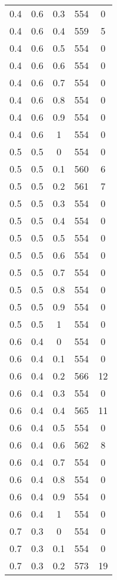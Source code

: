 \begin{table}
\begin{minipage}[!h]{0.50\hsize}
\begin{center}
{\begin{tabular}{|c|c|c|c|c|}
					0.4  & 0.6  & 0.3  & 554  & 0     \\
					0.4  & 0.6  & 0.4  & 559  & 5     \\
					0.4  & 0.6  & 0.5  & 554  & 0     \\
					0.4  & 0.6  & 0.6  & 554  & 0     \\
					0.4  & 0.6  & 0.7  & 554  & 0     \\
					0.4  & 0.6  & 0.8  & 554  & 0   \\
					0.4  & 0.6  & 0.9  & 554  & 0     \\
					0.4  & 0.6  & 1    & 554  & 0     \\ \hline
					0.5  & 0.5  & 0    & 554  & 0   \\
					0.5  & 0.5  & 0.1  & 560  & 6     \\
					0.5  & 0.5  & 0.2  & 561  & 7     \\
					0.5  & 0.5  & 0.3  & 554  & 0   \\
					0.5  & 0.5  & 0.4  & 554  & 0     \\
					0.5  & 0.5  & 0.5  & 554  & 0     \\
					0.5  & 0.5  & 0.6  & 554  & 0     \\
					0.5  & 0.5  & 0.7  & 554  & 0     \\
					0.5  & 0.5  & 0.8  & 554  & 0     \\
					0.5  & 0.5  & 0.9  & 554  & 0     \\
					0.5  & 0.5  & 1    & 554  & 0     \\ \hline
					0.6  & 0.4  & 0    & 554  & 0   \\
					0.6  & 0.4  & 0.1  & 554  & 0     \\
					0.6  & 0.4  & 0.2  & 566  & 12     \\
					0.6  & 0.4  & 0.3  & 554  & 0     \\
					0.6  & 0.4  & 0.4  & 565  & 11   \\
					0.6  & 0.4  & 0.5  & 554  & 0     \\
					0.6  & 0.4  & 0.6  & 562  & 8     \\
					0.6  & 0.4  & 0.7  & 554  & 0     \\
					0.6  & 0.4  & 0.8  & 554  & 0     \\
					0.6  & 0.4  & 0.9  & 554  & 0     \\
					0.6  & 0.4  & 1    & 554  & 0     \\ \hline
					0.7  & 0.3  & 0    & 554  & 0     \\
					0.7  & 0.3  & 0.1  & 554  & 0     \\
					0.7  & 0.3  & 0.2  & 573  & 19     \\
					\hline
			\end{tabular}}
			
		\end{center}
	\end{minipage}
\end{table}

